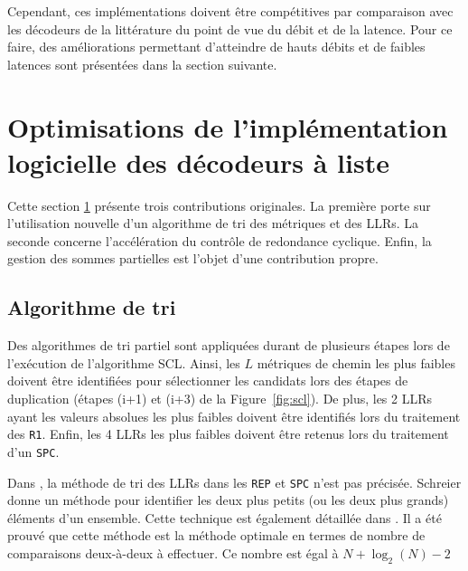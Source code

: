 Cependant, ces implémentations doivent être compétitives par comparaison avec les décodeurs de la littérature du point de vue du débit et de la latence. Pour ce faire, des améliorations permettant d'atteindre de hauts débits et de faibles latences sont présentées dans la section suivante.

\section{Optimisations de l'implémentation logicielle des décodeurs à liste}
\label{sec:opti_scl}
Cette section \ref{sec:opti_scl} présente trois contributions originales. La première porte sur l'utilisation nouvelle d'un algorithme de tri des métriques et des LLRs. La seconde concerne l'accélération du contrôle de redondance cyclique. Enfin, la gestion des sommes partielles est l'objet d'une contribution propre.

\subsection{Algorithme de tri}
Des algorithmes de tri partiel sont appliquées durant de plusieurs étapes lors de l'exécution de l'algorithme SCL. Ainsi, les $L$ métriques de chemin les plus faibles doivent être identifiées pour sélectionner les candidats lors des étapes de duplication (étapes (i+1) et (i+3) de la Figure~\ref{fig:scl}). De plus, les 2 LLRs ayant les valeurs absolues les plus faibles doivent être identifiés lors du traitement des \noeuds \texttt{R1}. Enfin, les 4 LLRs les plus faibles doivent être retenus lors du traitement d'un \noeud \texttt{SPC}. 


Dans \cite{sarkis_fast_2016}, la méthode de tri des LLRs dans les \noeuds \texttt{REP} et \texttt{SPC} n'est pas précisée.
Schreier \cite{schreier_tournament_1932} donne un méthode pour identifier les deux plus petits (ou les deux plus grands) éléments d'un ensemble. Cette technique est également détaillée dans \cite{knuth_art_1973}. 
Il a été prouvé que cette méthode est la méthode optimale en termes de nombre de comparaisons deux-à-deux à effectuer.
Ce nombre est égal à $N+\log_2(N)-2$

